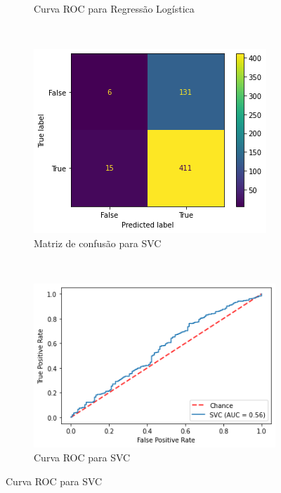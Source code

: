 \begin{figure}[htb]
\begin{subfigure}[b]{0.45\textwidth}
        \caption{Curva ROC para Regressão Logística}
        \label{fig:resultados:base-de-dados-28.3.8-roc-curve-logregression-monthly-cnae}
    \end{subfigure} ~ \\
        \begin{subfigure}[b]{0.45\textwidth}
        \includegraphics[scale=0.55]{images/base-de-dados-28.3.3-confusion-matrix-svc-monthly-cnae.png}
        \caption{Matriz de confusão para SVC}
        \label{fig:resultados:base-de-dados-28.3.3-confusion-matrix-svc-monthly-cnae}
    \end{subfigure} ~ \quad
    \begin{subfigure}[b]{0.45\textwidth}
        \includegraphics[scale=0.55]{images/base-de-dados-28.3.4-roc-curve-svc-monthly-cnae.png}
        \caption{Curva ROC para SVC}
        \label{fig:resultados:base-de-dados-28.3.4-roc-curve-svc-monthly-cnae}
    \end{subfigure}
    \fdadospesquisa
\end{figure}

